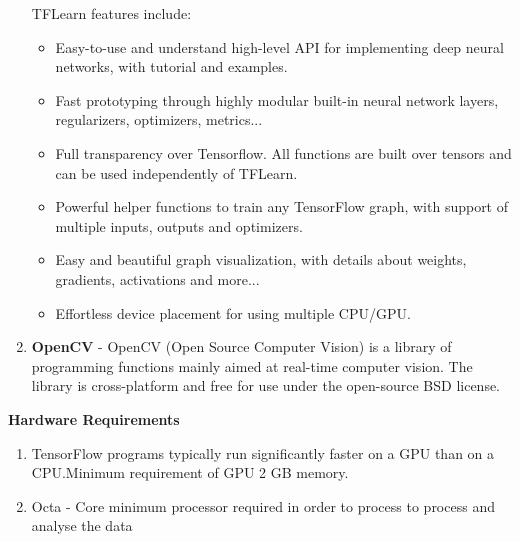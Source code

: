 \begin{enumerate}
	TFLearn features include:
	\begin{itemize}
		\item Easy-to-use and understand high-level API for implementing deep neural networks, with tutorial and examples.
		\item Fast prototyping through highly modular built-in neural network layers, regularizers, optimizers, metrics...
		\item Full transparency over Tensorflow. All functions are built over tensors and can be used independently of TFLearn.
		\item Powerful helper functions to train any TensorFlow graph, with support of multiple inputs, outputs and optimizers.
		\item Easy and beautiful graph visualization, with details about weights, gradients, activations and more...
		\item Effortless device placement for using multiple CPU/GPU.
		
	\end{itemize}

	\item \textbf{OpenCV} - OpenCV (Open Source Computer Vision) is a library of programming functions mainly aimed at real-time computer vision. The library is cross-platform and free for use under the open-source BSD license.
	
\end{enumerate}

\begin{flushleft}
	\textbf{Hardware Requirements}
\end{flushleft}
\begin{enumerate}
	\item TensorFlow programs typically run significantly faster on a GPU than on a CPU.Minimum requirement of GPU 2 GB memory.
	
	\item Octa - Core minimum processor required in order to process to process and analyse the data 
\end{enumerate}